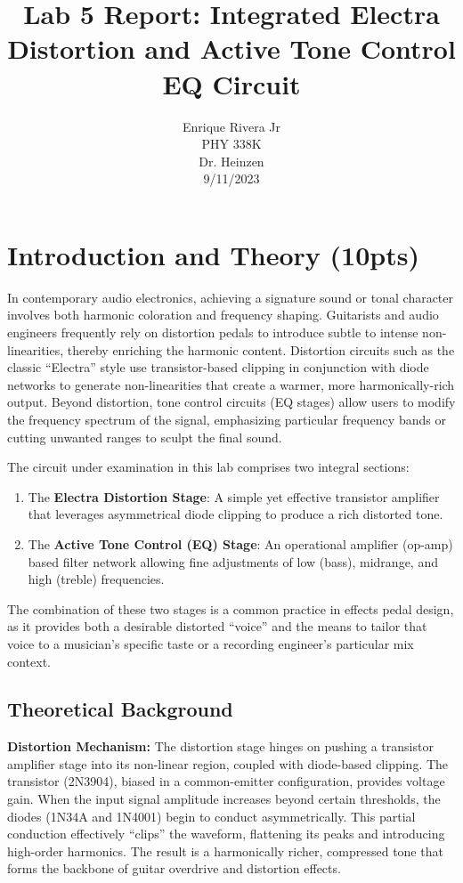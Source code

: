 \documentclass[12pt,a4paper]{article}
\begin{document}
\title{Lab 5 Report: Integrated Electra Distortion and Active Tone Control EQ Circuit}
\author{Enrique Rivera Jr \\
        PHY 338K \\
        Dr. Heinzen\\
        9/11/2023}
\date{}
\maketitle

\section{Introduction and Theory (10pts)}
In contemporary audio electronics, achieving a signature sound or tonal character involves both harmonic coloration and frequency shaping. Guitarists and audio engineers frequently rely on distortion pedals to introduce subtle to intense non-linearities, thereby enriching the harmonic content. Distortion circuits such as the classic ``Electra'' style use transistor-based clipping in conjunction with diode networks to generate non-linearities that create a warmer, more harmonically-rich output. Beyond distortion, tone control circuits (EQ stages) allow users to modify the frequency spectrum of the signal, emphasizing particular frequency bands or cutting unwanted ranges to sculpt the final sound.

The circuit under examination in this lab comprises two integral sections:
\begin{enumerate}
    \item The \textbf{Electra Distortion Stage}: A simple yet effective transistor amplifier that leverages asymmetrical diode clipping to produce a rich distorted tone.
    \item The \textbf{Active Tone Control (EQ) Stage}: An operational amplifier (op-amp) based filter network allowing fine adjustments of low (bass), midrange, and high (treble) frequencies.
\end{enumerate}

The combination of these two stages is a common practice in effects pedal design, as it provides both a desirable distorted ``voice'' and the means to tailor that voice to a musician's specific taste or a recording engineer’s particular mix context.

\subsection{Theoretical Background}
\textbf{Distortion Mechanism:}  
The distortion stage hinges on pushing a transistor amplifier stage into its non-linear region, coupled with diode-based clipping. The transistor (2N3904), biased in a common-emitter configuration, provides voltage gain. When the input signal amplitude increases beyond certain thresholds, the diodes (1N34A and 1N4001) begin to conduct asymmetrically. This partial conduction effectively ``clips'' the waveform, flattening its peaks and introducing high-order harmonics. The result is a harmonically richer, compressed tone that forms the backbone of guitar overdrive and distortion effects.
\end{document}

